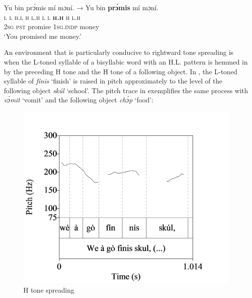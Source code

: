 \ea%
    \label{ex:key:50}
    \glll   Yu  bin  prɔ́mis  mí    mɔní.  →    Yu  bin  \textbf{prɔ́mis}  mí  mɔní.\\
\textsc{l}  \textsc{l}  \textsc{h.l}    \textsc{h}    \textsc{l.h}         {} \textsc{l}  \textsc{l}  \textbf{\textsc{h.h}}    \textsc{h}  \textsc{l.h}\\
\textsc{2sg}  \textsc{pst}  promise  \textsc{1sg.indp}  money\\
\glt ‘You promised me money.’
\z

An environment that is particularly conducive to rightward tone spreading is when the L-toned syllable of a bisyllabic word with an H.L. pattern is hemmed in by the preceding H tone and the H tone of a following object. In , the L-toned syllable of \textit{fínis} ‘finish’ is raised in pitch approximately to the level of the following object \textit{skúl} ‘school’. The pitch trace in  exemplifies the same process with \textit{vɔ́mit} ‘vomit’ and the following object \textit{chɔ́p} ‘food’:


\begin{figure}
\caption{H tone spreading}
\label{fig:key:3.12}
\includegraphics[height=.3\textheight]{figures/yakpomod-img14.png}
\end{figure}

